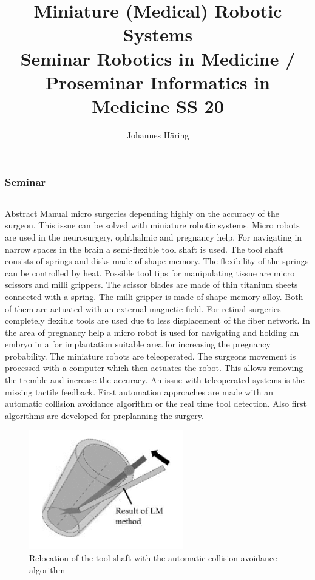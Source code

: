 \documentclass{beamer}
\title[Short title]{Miniature (Medical) Robotic Systems \\ \Large Seminar Robotics in Medicine / Proseminar Informatics in Medicine SS 20\\ [.4em] }
\author{Johannes Häring}
\institute{\textbf{Institute for Anthropomatics and Robotics - \\[.2em]
Health Robotics and Automation}\\[.4em]
Engler-Bunte-Ring 8\\[.2em]
76131 Karlsruhe\\[.4em]
\href{http://hera.iar.kit.edu}{http://www.hera.iar.kit.edu}}
\begin{document}

\begin{frame}
\frametitle{Seminar}
\Large 

\begin{columns}[] %
    \begin{column}{0.45\textwidth}
        \begin{block}{\LARGE Abstract}
            \justifying \normalsize 
            Manual micro surgeries depending highly on the accuracy of the surgeon. This issue can be solved with miniature robotic systems. Micro robots are used in the neurosurgery, ophthalmic and pregnancy help. For navigating in narrow spaces in the brain a semi-flexible tool shaft is used. The tool shaft consists of springs and disks made of shape memory. The flexibility of the springs can be controlled by heat. Possible tool tips for manipulating tissue are micro scissors and milli grippers. The scissor blades are made of thin titanium sheets connected with a spring. The milli gripper is made of shape memory alloy. Both of them are actuated with an external magnetic field. For retinal surgeries completely flexible tools are used due to less displacement of the fiber network. In the area of pregnancy help a micro robot is used for navigating and holding an embryo in a for implantation suitable area for increasing the pregnancy probability. The miniature robots are teleoperated. The surgeons movement is processed with a computer which then actuates the robot. This allows removing the tremble and increase the accuracy. An issue with teleoperated systems is the missing tactile feedback. First automation approaches are made with an automatic collision avoidance algorithm or the real time tool detection. Also first algorithms are developed for preplanning the surgery.
        \end{block}    
        
        \vspace*{20pt}
        
        \begin{figure}
            \centering
            \includegraphics[width=0.6\textwidth]{figures/collision_avoidance.png}
            \caption{Relocation of the tool shaft with the automatic collision avoidance algorithm \cite{collisionAvoidanceNeuro}}
            \label{fig:gripper_design}
        \end{figure}
    

\end{column}
\end{columns}
\end{frame}
\end{document}
